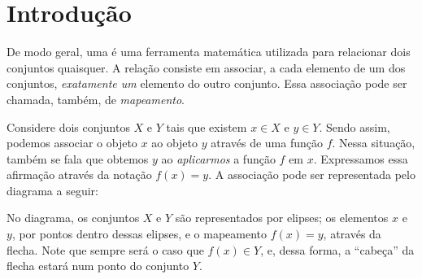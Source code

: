 \section{Introdução}

De modo geral, uma  é uma ferramenta matemática utilizada para relacionar dois conjuntos quaisquer. 
A relação consiste em associar, a cada elemento de um dos conjuntos, \emph{exatamente um} elemento do outro conjunto.
Essa associação pode ser chamada, também, de \emph{mapeamento}.

Considere dois conjuntos $X$ e $Y$ tais que existem $x \in X$ e $y \in Y$. Sendo assim, podemos associar o objeto $x$ ao objeto $y$ através de uma função $f$. Nessa situação, também se fala que obtemos $y$ ao \emph{aplicarmos} a função $f$ em $x$. Expressamos essa afirmação através da notação $f(x) = y$. A associação pode ser representada pelo diagrama a seguir:
%
\begin{center}
     
\end{center}
%
No diagrama, os conjuntos $X$ e $Y$ são representados por elipses; os elementos $x$ e $y$, por pontos dentro dessas elipses, e o mapeamento $f(x) = y$, através da flecha. Note que sempre será o caso que $f(x) \in Y$, e, dessa forma, a ``cabeça'' da flecha estará num ponto do conjunto $Y$.